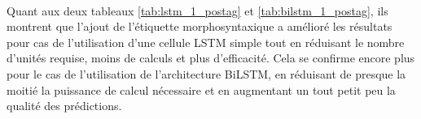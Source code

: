 	\paragraph{}
	Quant aux deux tableaux \ref{tab:lstm_1_postag} et \ref{tab:bilstm_1_postag}, ils montrent que l'ajout de l'étiquette morphosyntaxique a amélioré les résultats pour cas de l'utilisation d'une cellule LSTM simple tout en réduisant le nombre d'unités requise, moins de calculs et plus d'efficacité. Cela se confirme encore plus pour le cas de l'utilisation de l'architecture BiLSTM, en réduisant de presque la moitié la puissance de calcul nécessaire et en augmentant un tout petit peu la qualité des prédictions.
	
	
	
	
